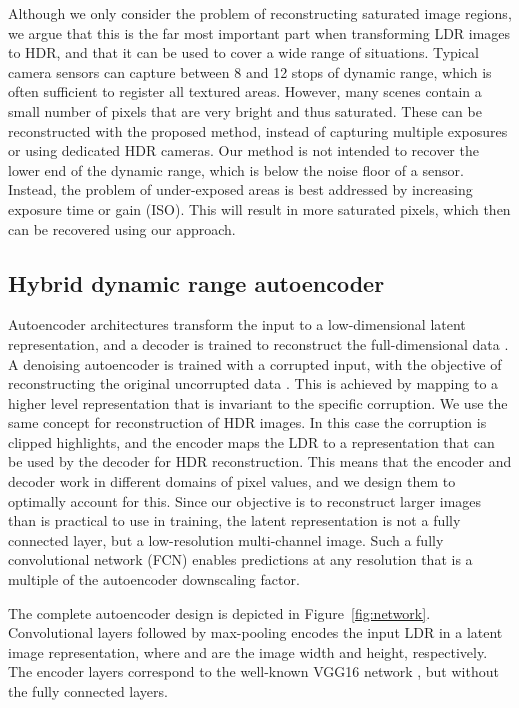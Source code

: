 \documentclass[acmtog]{acmart}
\newcommand{\figref}[1]{Figure~\ref{fig:#1}}
\begin{document}
\noindent Although we only consider the problem of reconstructing saturated image regions, we argue that this is the far most important part when transforming LDR images to HDR, and that it can be used to cover a wide range of situations. Typical camera sensors can capture between 8 and 12 stops of dynamic range, which is often sufficient to register all textured areas. However, many scenes contain a small number of pixels that are very bright and thus saturated. These can be reconstructed with the proposed method, instead of capturing multiple exposures or using dedicated HDR cameras. Our method is not intended to recover the lower end of the dynamic range, which is below the noise floor of a sensor. Instead, the problem of under-exposed areas is best addressed by increasing exposure time or gain (ISO). This will result in more saturated pixels, which then can be recovered using our approach.

\subsection{Hybrid dynamic range autoencoder}\label{sec:network}
Autoencoder architectures transform the input to a low-dimensional latent representation, and a decoder is trained to reconstruct the full-dimensional data \cite{hinton2006reducing}. A denoising autoencoder is trained with a corrupted input, with the objective of reconstructing the original uncorrupted data \cite{Vincent2008}. This is achieved by mapping to a higher level representation that is invariant to the specific corruption. We use the same concept for reconstruction of HDR images. In this case the corruption is clipped highlights, and the encoder maps the LDR to a representation that can be used by the decoder for HDR reconstruction. This means that the encoder and decoder work in different domains of pixel values, and we design them to optimally account for this. Since our objective is to reconstruct larger images than is practical to use in training, the latent representation is not a fully connected layer, but a low-resolution multi-channel image. Such a fully convolutional network (FCN) enables predictions at any resolution that is a multiple of the autoencoder downscaling factor.

The complete autoencoder design is depicted in \figref{network}. Convolutional layers followed by max-pooling encodes the input LDR in a  latent image representation, where  and  are the image width and height, respectively. The encoder layers correspond to the well-known VGG16 network \cite{Simonyan2014}, but without the fully connected layers.
\end{document}
